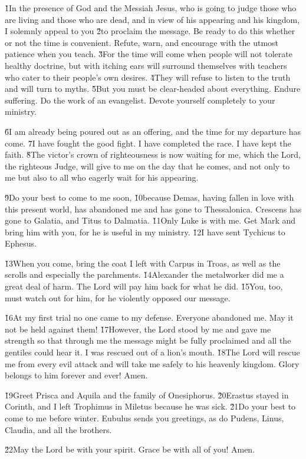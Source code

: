 \v{1}In the presence of God and the Messiah Jesus, who is going to judge those who are living and those who are dead, and in view of his appearing and his kingdom, I solemnly appeal to you \v{2}to proclaim the message. Be ready to do this whether or not the time is convenient. Refute, warn, and encourage with the utmost patience when you teach. \v{3}For the time will come when people will not tolerate healthy doctrine, but with itching ears will surround themselves with teachers who cater to their people's own desires. \v{4}They will refuse to listen to the truth and will turn to myths. \v{5}But you must be clear-headed about everything. Endure suffering. Do the work of an evangelist. Devote yourself completely to your ministry.

\v{6}I am already being poured out as an offering, and the time for my departure has come. \v{7}I have fought the good fight. I have completed the race. I have kept the faith. \v{8}The victor's crown of righteousness is now waiting for me, which the Lord, the righteous Judge, will give to me on the day that he comes, and not only to me but also to all who eagerly wait for his appearing.

\v{9}Do your best to come to me soon, \v{10}because Demas, having fallen in love with this present world, has abandoned me and has gone to Thessalonica. Crescens has gone to Galatia, and Titus to Dalmatia. \v{11}Only Luke is with me. Get Mark and bring him with you, for he is useful in my ministry. \v{12}I have sent Tychicus to Ephesus.

\v{13}When you come, bring the coat I left with Carpus in Troas, as well as the scrolls and especially the parchments. \v{14}Alexander the metalworker did me a great deal of harm. The Lord will pay him back for what he did. \v{15}You, too, must watch out for him, for he violently opposed our message.

\v{16}At my first trial no one came to my defense. Everyone abandoned me. May it not be held against them! \v{17}However, the Lord stood by me and gave me strength so that through me the message might be fully proclaimed and all the gentiles could hear it. I was rescued out of a lion's mouth. \v{18}The Lord will rescue me from every evil attack and will take me safely to his heavenly kingdom. Glory belongs to him forever and ever! Amen.

\v{19}Greet Prisca and Aquila and the family of Onesiphorus. \v{20}Erastus stayed in Corinth, and I left Trophimus in Miletus because he was sick. \v{21}Do your best to come to me before winter. Eubulus sends you greetings, as do Pudens, Linus, Claudia, and all the brothers.

\v{22}May the Lord be with your spirit. Grace be with all of you! Amen.
